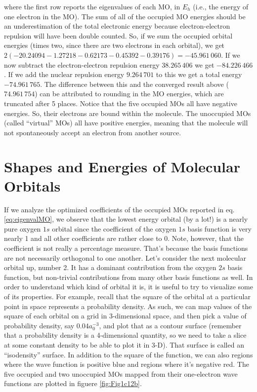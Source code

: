\documentclass[
  9pt,
]{extbook}
\theoremstyle{definition}
\theoremstyle{definition}
\theoremstyle{definition}
\theoremstyle{remark}
\begin{document}
where the first row reports the eigenvalues of each MO, in \(E_h\) (i.e., the energy of one electron in the MO). The sum of all of the occupied MO energies should be an underestimation of the total electronic energy because electron-electron repulsion will have been double counted. So, if we sum the occupied orbital energies (times two, since there are two electrons in each orbital), we get \(2(-20.24094{-}1.27218{-}0.62173{-}0.45392{-}0.39176)=-45.961\,060\). If we now subtract the electron-electron repulsion energy \(38.265\,406\) we get \(-84.226\,466\). If we add the nuclear repulsion energy \(9.264\,701\) to this we get a total energy \(-74.961\,765\). The difference between this and the converged result above (\(74.961\,754\)) can be attributed to rounding in the MO energies, which are truncated after 5 places. Notice that the five occupied MOs all have negative energies. So, their electrons are bound within the molecule. The unoccupied MOs (called ``virtual'' MOs) all have positive energies, meaning that the molecule will not spontaneously accept an electron from another source.

\hypertarget{shapes-and-energies-of-molecular-orbitals}{%
\section{Shapes and Energies of Molecular Orbitals}\label{shapes-and-energies-of-molecular-orbitals}}

If we analyze the optimized coefficients of the occupied MOs reported in eq. \eqref{eq:eigenvalMO}, we observe that the lowest energy orbital (by a lot!) is a nearly pure oxygen \(1s\) orbital since the coefficient of the oxygen \(1s\) basis function is very nearly 1 and all other coefficients are rather close to 0. Note, however, that the coefficient is not really a percentage measure. That's because the basis functions are not necessarily orthogonal to one another. Let's consider the next molecular orbital up, number 2. It has a dominant contribution from the oxygen \(2s\) basis function, but non-trivial contributions from many other basis functions as well. In order to understand which kind of orbital it is, it is useful to try to visualize some of its properties. For example, recall that the square of the orbital at a particular point in space represents a probability density. As such, we can map values of the square of each orbital on a grid in 3-dimensional space, and then pick a value of probability density, say \(0.04 a_0^{-3}\), and plot that as a contour surface (remember that a probability density is a 4-dimensional quantity, so we need to take a slice at some constant density to be able to plot it in 3-D). That surface is called an ``isodensity'' surface. In addition to the square of the function, we can also regions where the wave function is positive blue and regions where it's negative red. The five occupied and two unoccupied MOs mapped from their one-electron wave functions are plotted in figuere \ref{fig:Fig1c12b}.
\end{document}
